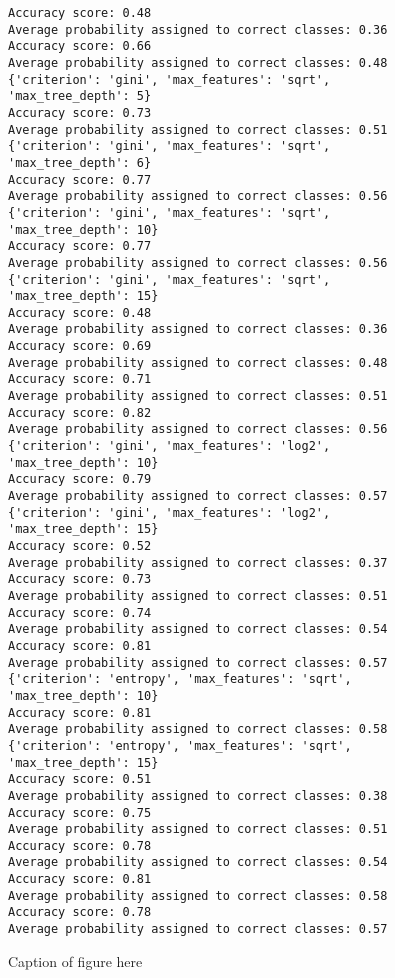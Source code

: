 \begin{figure}[H]
\begin{verbatim}
Accuracy score: 0.48
Average probability assigned to correct classes: 0.36
Accuracy score: 0.66
Average probability assigned to correct classes: 0.48
{'criterion': 'gini', 'max_features': 'sqrt', 'max_tree_depth': 5}
Accuracy score: 0.73
Average probability assigned to correct classes: 0.51
{'criterion': 'gini', 'max_features': 'sqrt', 'max_tree_depth': 6}
Accuracy score: 0.77
Average probability assigned to correct classes: 0.56
{'criterion': 'gini', 'max_features': 'sqrt', 'max_tree_depth': 10}
Accuracy score: 0.77
Average probability assigned to correct classes: 0.56
{'criterion': 'gini', 'max_features': 'sqrt', 'max_tree_depth': 15}
Accuracy score: 0.48
Average probability assigned to correct classes: 0.36
Accuracy score: 0.69
Average probability assigned to correct classes: 0.48
Accuracy score: 0.71
Average probability assigned to correct classes: 0.51
Accuracy score: 0.82
Average probability assigned to correct classes: 0.56
{'criterion': 'gini', 'max_features': 'log2', 'max_tree_depth': 10}
Accuracy score: 0.79
Average probability assigned to correct classes: 0.57
{'criterion': 'gini', 'max_features': 'log2', 'max_tree_depth': 15}
Accuracy score: 0.52
Average probability assigned to correct classes: 0.37
Accuracy score: 0.73
Average probability assigned to correct classes: 0.51
Accuracy score: 0.74
Average probability assigned to correct classes: 0.54
Accuracy score: 0.81
Average probability assigned to correct classes: 0.57
{'criterion': 'entropy', 'max_features': 'sqrt', 'max_tree_depth': 10}
Accuracy score: 0.81
Average probability assigned to correct classes: 0.58
{'criterion': 'entropy', 'max_features': 'sqrt', 'max_tree_depth': 15}
Accuracy score: 0.51
Average probability assigned to correct classes: 0.38
Accuracy score: 0.75
Average probability assigned to correct classes: 0.51
Accuracy score: 0.78
Average probability assigned to correct classes: 0.54
Accuracy score: 0.81
Average probability assigned to correct classes: 0.58
Accuracy score: 0.78
Average probability assigned to correct classes: 0.57
\end{verbatim}
\caption{Caption of figure here}
\end{figure}